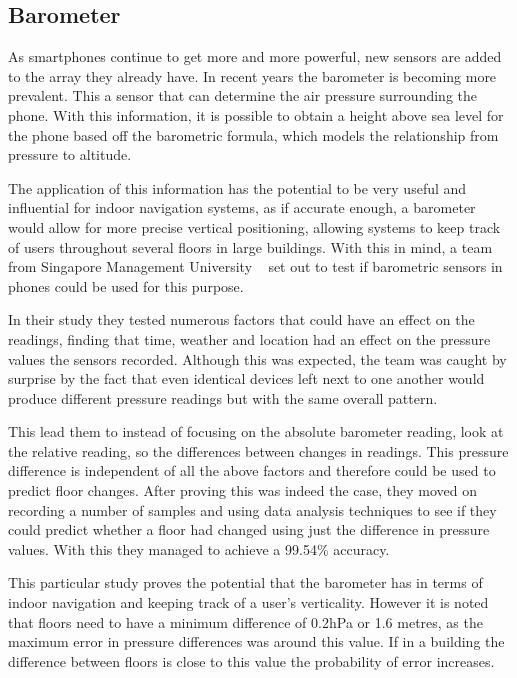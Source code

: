\documentclass[main.tex]{subfiles}
\begin{document}
\subsection{Barometer}

As smartphones continue to get more and more powerful, new sensors are added to the array they already have. In recent years the barometer is becoming more prevalent. This a sensor that can determine the air pressure surrounding the phone. With this information, it is possible to obtain a height above sea level for the phone based off the barometric formula, which models the relationship from pressure to altitude.

The application of this information has the potential to be very useful and influential for indoor navigation systems, as if accurate enough, a barometer would allow for more precise vertical positioning, allowing systems to keep track of users throughout several floors in large buildings. With this in mind, a team from Singapore Management University ~\cite{baro2014} set out to test if barometric sensors in phones could be used for this purpose.

In their study they tested numerous factors that could have an effect on the readings, finding that  time, weather and location had an effect on the pressure values the sensors recorded. Although this was expected, the team was caught by surprise by the fact that even identical devices left next to one another would produce different pressure readings but with the same overall pattern. ~\cite[p.2]{baro2014}

This lead them to instead of focusing on the absolute barometer reading, look at the relative reading, so the differences between changes in readings. This pressure difference is independent of all the above factors and therefore could be used to predict floor changes. After proving this was indeed the case, they moved on recording a number of samples and using data analysis techniques to see if they could predict whether a floor had changed using just the difference in pressure values. With this they managed to achieve a 99.54\% accuracy.

This particular study proves the potential that the barometer has in terms of indoor navigation and keeping track of a user's verticality. However it is noted that floors need to have a minimum difference of 0.2hPa or 1.6 metres, as the maximum error in pressure differences was around this value. If in a building the difference between floors is close to this value the probability of error increases.
\end{document}
